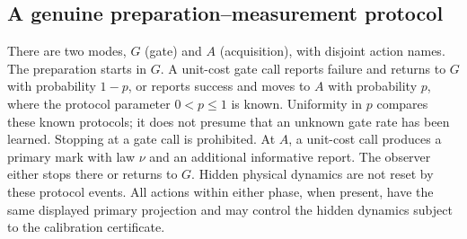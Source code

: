 \subsection{A genuine preparation--measurement protocol}
There are two modes, $G$ (gate) and $A$ (acquisition), with disjoint action names. The preparation starts in $G$. A unit-cost gate call reports failure and returns to $G$ with probability $1-p$, or reports success and moves to $A$ with probability $p$, where the protocol parameter $0<p\le1$ is known. Uniformity in $p$ compares these known protocols; it does not presume that an unknown gate rate has been learned. Stopping at a gate call is prohibited. At $A$, a unit-cost call produces a primary mark with law $\nu$ and an additional informative report. The observer either stops there or returns to $G$. Hidden physical dynamics are not reset by these protocol events. All actions within either phase, when present, have the same displayed primary projection and may control the hidden dynamics subject to the calibration certificate.

